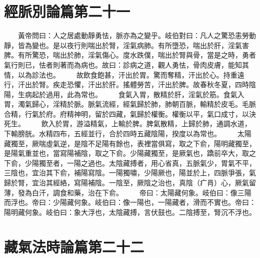 \section{經脈別論篇第二十一}

　　黃帝問曰：人之居處動靜勇怯，脈亦為之變乎。岐伯對曰：凡人之驚恐恚勞動靜，皆為變也。是以夜行則喘出於腎，淫氣病肺。有所墮恐，喘出於肝，淫氣害脾。有所驚恐，喘出於肺，淫氣傷心。度水跌僕，喘出於腎與骨，當是之時，勇者氣行則已，怯者則著而為病也。故曰：診病之道，觀人勇怯，骨肉皮膚，能知其情，以為診法也。
　　故飲食飽甚，汗出於胃。驚而奪精，汗出於心。持重遠行，汗出於腎。疾走恐懼，汗出於肝。搖體勞苦，汗出於脾。故春秋冬夏，四時陰陽，生病起於過用，此為常也。
　　食氣入胃，散精於肝，淫氣於筋。食氣入胃，濁氣歸心，淫精於脈。脈氣流經，經氣歸於肺，肺朝百脈，輸精於皮毛。毛脈合精，行氣於府。府精神明，留於四藏，氣歸於權衡。權衡以平，氣口成寸，以決死生。
　　飲入於胃，游溢精氣，上輸於脾。脾氣散精，上歸於肺，通調水道，下輸膀胱。水精四布，五經並行，合於四時五藏陰陽，揆度以為常也。
　　太陽藏獨至，厥喘虛氣逆，是陰不足陽有餘也，表裡當俱寫，取之下俞，陽明藏獨至，是陽氣重並也，當寫陽補陰，取之下俞。少陽藏獨至，是厥氣也，蹻前卒大，取之下俞，少陽獨至者，一陽之過也。太陰藏搏者，用心省真，五脈氣少，胃氣不平，三陰也，宜治其下俞，補陽寫陰。一陽獨嘯，少陽厥也，陽並於上，四脈爭張，氣歸於腎，宜治其經絡，寫陽補陰。一陰至，厥陰之治也，真陰（疒肙）心，厥氣留薄，發為白汗，調食和藥，治在下俞。
　　帝曰：太陽藏何象。岐伯曰：像三陽而浮也。帝曰：少陽藏何象。岐伯曰：像一陽也，一陽藏者，滑而不實也。帝曰：陽明藏何象。岐伯曰：象大浮也，太陰藏搏，言伏鼓也。二陰搏至，腎沉不浮也。


\section{藏氣法時論篇第二十二}

